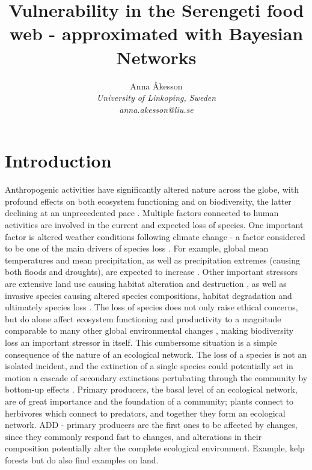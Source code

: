 \documentclass[a4paper,11pt]{article}
\title{Vulnerability in the Serengeti food web - approximated with Bayesian Networks}
\author{Anna {\AA}kesson\\
\it \footnotesize University of Linkoping, Sweden\\
\it \footnotesize anna.akesson@liu.se}
\date{}
\begin{document}
\maketitle				
\onehalfspacing

\section*{Introduction}

Anthropogenic activities have significantly altered nature across the globe, with profound effects on both ecosystem functioning and on biodiversity, the latter declining at an unprecedented pace \cite{Diazetal2019}. Multiple factors connected to human activities are involved in the current and expected loss of species. One important factor is altered weather conditions following climate change - a factor considered to be one of the main drivers of species loss \cite{Zedan2004}. For example, global mean temperatures and mean precipitation, as well as precipitation extremes (causing both floods and droughts), are expected to increase \cite{IPCC}. Other important stressors are extensive land use causing habitat alteration and destruction \cite{Diazetal2019, Zedan2004}, as well as invasive species causing altered species compositions, habitat degradation and ultimately species loss \cite{Didhametal2005, MainkaHoward2010}. The loss of species does not only raise ethical concerns, but do alone affect ecosystem functioning and productivity to a magnitude comparable to many other global environmental changes \cite{Hooperetal2012}, making biodiversity loss an important stressor in itself. This cumbersome situation is a simple consequence of the nature of an ecological network. The loss of a species is not an isolated incident, and the extinction of a single species could potentially set in motion a cascade of secondary extinctions pertubating through the community by bottom-up effects \cite{EbenmanJonsson2005}. Primary producers, the basal level of an ecological network, are of great importance and the foundation of a community; plants connect to herbivores which connect to predators, and together they form an ecological network. ADD - primary producers are the first ones to be affected by changes, since they commonly respond fast to changes, and alterations in their composition potentially alter the complete ecological environment. Example, kelp forests but do also find examples on land. 
\end{document}
